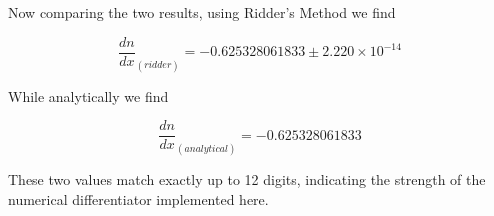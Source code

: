 Now comparing the two results, using Ridder's Method we find

\begin{equation*}
    \frac{dn}{dx}_{(ridder)} = -0.625328061833 \pm 2.220 \times 10^{-14}
\end{equation*}

While analytically we find

\begin{equation*}
    \frac{dn}{dx}_{(analytical)} = -0.625328061833
\end{equation*}

These two values match exactly up to 12 digits, indicating the strength of the numerical differentiator implemented here.

